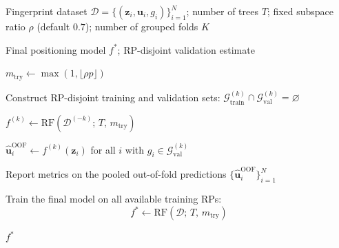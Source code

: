 \begin{algorithm}[t]
	\caption{RP-Aware Random-Subspace RTT--RSS Localization}
	\label{alg:subspace_rf}
	\begin{algorithmic}[1]

		\Require
		Fingerprint dataset
		$\mathcal{D}=\{(\mathbf{z}_i,\mathbf{u}_i,g_i)\}_{i=1}^{N}$;
		number of trees $T$;
		fixed subspace ratio $\rho$ (default $0.7$);
		number of grouped folds $K$

		\Ensure
		Final positioning model $f^{*}$; RP-disjoint validation estimate

		\State $m_{\mathrm{try}} \leftarrow \max(1,\lfloor \rho p \rfloor)$


		\State Construct RP-disjoint training and validation sets:
		$\mathcal{G}^{(k)}_{\mathrm{train}}\cap\mathcal{G}^{(k)}_{\mathrm{val}}=\varnothing$

		\State $f^{(k)} \leftarrow \mathrm{RF}\left(\mathcal{D}^{(-k)};\,T,\,m_{\mathrm{try}}\right)$

		\State $\hat{\mathbf{u}}_i^{\mathrm{OOF}} \leftarrow f^{(k)}(\mathbf{z}_i)$ for all $i$ with $g_i\in\mathcal{G}^{(k)}_{\mathrm{val}}$

		\EndFor

		\State Report metrics on the pooled out-of-fold predictions
		$\{\hat{\mathbf{u}}_i^{\mathrm{OOF}}\}_{i=1}^{N}$

		\State Train the final model on all available training RPs:
		\[
		f^{*}
		\leftarrow
		\mathrm{RF}
		\left(
		\mathcal{D};\,
		T,\,
		m_{\mathrm{try}}
		\right)
		\]

		\State \Return $f^{*}$

	\end{algorithmic}
\end{algorithm}

